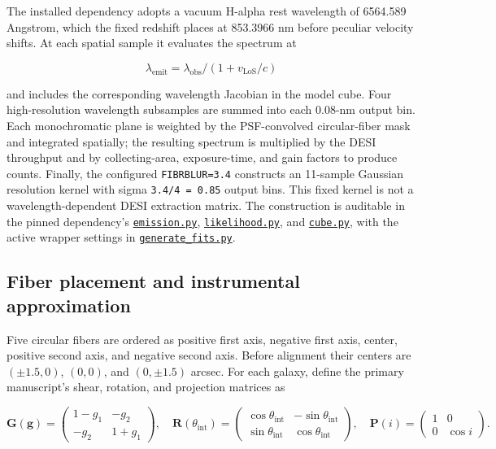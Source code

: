 \documentclass[11pt]{article}
\newcommand{\code}[1]{\nolinkurl{#1}}
\begin{document}
The installed dependency adopts a vacuum H-alpha rest wavelength of 6564.589
Angstrom, which the fixed redshift places at 853.3966 nm before peculiar
velocity shifts. At each spatial sample it evaluates the spectrum at

\[
\lambda_\mathrm{emit}=\lambda_\mathrm{obs}/(1+v_\mathrm{LoS}/c)
\]

and includes the corresponding wavelength Jacobian in the model cube. Four
high-resolution wavelength subsamples are summed into each 0.08-nm output bin.
Each monochromatic plane is weighted by the PSF-convolved circular-fiber mask
and integrated spatially; the resulting spectrum is multiplied by the DESI
throughput and by collecting-area, exposure-time, and gain factors to produce
counts. Finally, the configured \code{FIBRBLUR=3.4} constructs an 11-sample Gaussian
resolution kernel with sigma \code{3.4/4 = 0.85} output bins. This fixed kernel is
not a wavelength-dependent DESI extraction matrix. The construction is
auditable in the pinned dependency's
\href{https://github.com/wxs0703/kl-tools/blob/42e06b69e11f0282521c53aac8f5093ce52e3bf9/kl_tools/emission.py}{\code{emission.py}},
\href{https://github.com/wxs0703/kl-tools/blob/42e06b69e11f0282521c53aac8f5093ce52e3bf9/kl_tools/likelihood.py}{\code{likelihood.py}},
and
\href{https://github.com/wxs0703/kl-tools/blob/42e06b69e11f0282521c53aac8f5093ce52e3bf9/kl_tools/cube.py}{\code{cube.py}},
with the active wrapper settings in
\href{../data_generate/generate_fits.py}{\code{generate_fits.py}}.

\subsection{Fiber placement and instrumental approximation}

Five circular fibers are ordered as positive first axis, negative first axis,
center, positive second axis, and negative second axis. Before alignment their
centers are \((\pm1.5,0)\), \((0,0)\), and \((0,\pm1.5)\) arcsec. For each
galaxy, define the primary manuscript's shear, rotation, and projection
matrices as

\[
\mathbf G(\bm g)=
\begin{pmatrix}1-g_1&-g_2\\-g_2&1+g_1\end{pmatrix},
\quad
\mathbf R(\theta_\mathrm{int})=
\begin{pmatrix}
\cos\theta_\mathrm{int}&-\sin\theta_\mathrm{int}\\\sin\theta_\mathrm{int}&\cos\theta_\mathrm{int}
\end{pmatrix},
\quad
\mathbf P(i)=
\begin{pmatrix}1&0\\0&\cos i\end{pmatrix}.
\]
\end{document}
